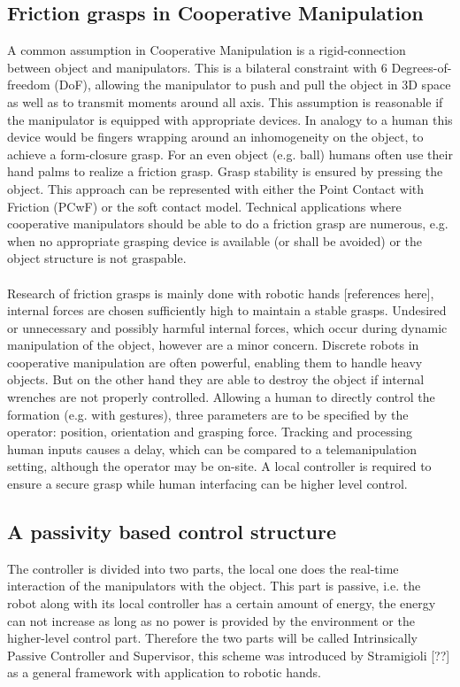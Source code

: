 \documentclass[a4paper,twoside, openright,12pt]{report}
\begin{document}
\subsection{Friction grasps in Cooperative Manipulation}
A common assumption in Cooperative Manipulation is a rigid-connection between object and manipulators. This is a bilateral constraint with 6 Degrees-of-freedom (DoF), allowing the manipulator to push and pull the object in 3D space as well as to transmit moments around all axis. 
This assumption is reasonable if the manipulator is equipped with appropriate devices. In analogy to a human this device would be fingers wrapping around an inhomogeneity on the object, to achieve a form-closure grasp.  For an even object (e.g. ball) humans often use their hand palms to realize a friction grasp. Grasp stability is ensured by pressing the object. This approach can be represented with either the Point Contact with Friction (PCwF) or the soft contact model. 
Technical applications where cooperative manipulators should be able to do a friction grasp are numerous, e.g. when no appropriate grasping device is available (or shall be avoided) or the object structure is not graspable.
\\ \\
Research of friction grasps is mainly done with robotic hands [references here], internal forces are chosen sufficiently high to maintain a stable grasps. Undesired or unnecessary and possibly harmful internal forces, which occur during dynamic manipulation of the object, however are a minor concern. Discrete robots in cooperative manipulation are often powerful, enabling them to handle heavy objects. But on the other hand they are able to destroy the object if internal wrenches are not properly controlled.
Allowing a human to directly control the formation (e.g. with gestures), three parameters are to be specified by the operator: position, orientation and grasping force. Tracking and processing human inputs causes a delay, which can be compared to a telemanipulation setting, although the operator may be on-site. A local controller is required to ensure a secure grasp while human interfacing can be higher level control.
\subsection{A passivity based control structure}
The controller is divided into two parts, the local one does the real-time interaction of the manipulators with the object. This part is passive, i.e. the robot along with its local controller has a certain amount of energy, the energy can not increase as long as no power is provided by the environment or the higher-level control part. Therefore the two parts will be called Intrinsically Passive Controller and Supervisor, this scheme was introduced by Stramigioli [??] as a general framework with application to robotic hands.
\end{document}
